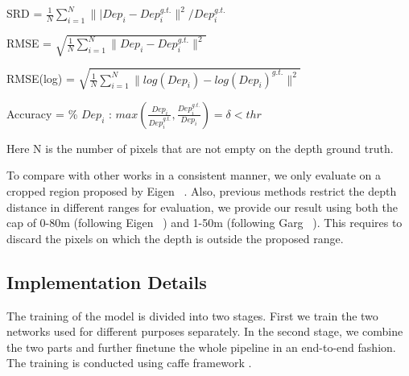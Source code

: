 \documentclass[10pt,twocolumn,letterpaper]{article}
\begin{document}
SRD = $\frac{1}{N}\sum_{i=1}^N{\lVert|Dep_i - Dep_i^{g.t.}\rVert^2}/{Dep_i^{g.t.}}$

RMSE = $\sqrt{\frac{1}{N}\sum_{i=1}^N\lVert Dep_i - Dep_i^{g.t.} \rVert^2}$

RMSE(log) = $\sqrt{\frac{1}{N}\sum_{i=1}^N\lVert log(Dep_i) - log(Dep_i)^{g.t.} \rVert^2}$

Accuracy = \% $Dep_i$ : $max(\frac{Dep_i}{Dep_i^{g.t.}},\frac{Dep_i^{g.t.}}{Dep_i})=\delta < thr$

Here N is the number of pixels that are not empty on the depth ground truth.

To compare with other works in a consistent manner, we only evaluate on a cropped region proposed by Eigen \etal~\cite{eigen2014depth}. Also, previous methods restrict the depth distance in different ranges for evaluation, we provide our result using both the cap of 0-80m (following Eigen \etal~\cite{eigen2014depth}) and 1-50m (following Garg \etal~\cite{garg2016unsupervised}). This requires to discard the pixels on which the depth is outside the proposed range. 

\subsection{Implementation Details}
\label{secion:impl_details}
The training of the model is divided into two stages. First we train the two networks used for different purposes separately. In the second stage, we combine the two parts and further finetune the whole pipeline in an end-to-end fashion. The training is conducted using caffe framework \cite{jia14caffe}.
\end{document}
